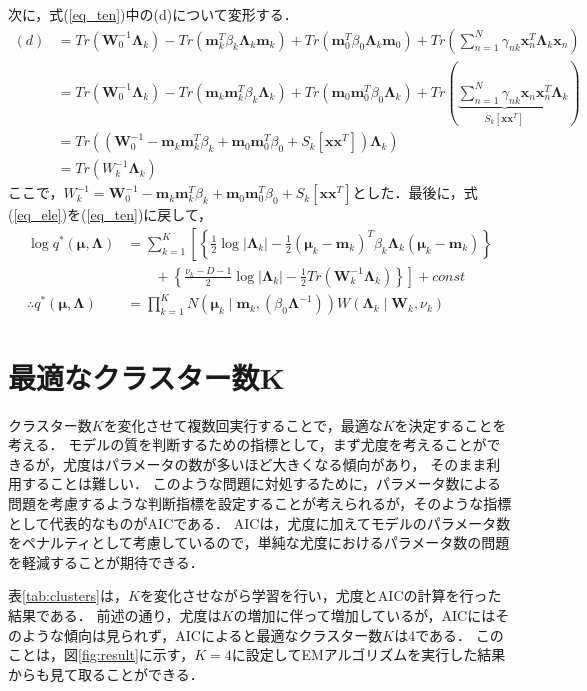 \documentclass[uplatex]{jsarticle}
\begin{document}
次に，式(\ref{eq_ten})中の(d)について変形する．
\begin{align}
\label{eq_ele}
(d) &= Tr(\bm{W}_0^{-1}\bm{\Lambda}_k) - Tr(\bm{m}_k^T\beta_k\bm{\Lambda}_k\bm{m}_k) + Tr(\bm{m}_0^T\beta_0\bm{\Lambda}_k\bm{m}_0) + Tr(\sum_{n=1}^N \gamma_{nk}\bm{x}_n^T\bm{\Lambda}_k\bm{x}_n) \nonumber \\
    &= Tr(\bm{W}_0^{-1}\bm{\Lambda}_k) - Tr(\bm{m}_k\bm{m}_k^T\beta_k\bm{\Lambda}_k) + Tr(\bm{m}_0\bm{m}_0^T\beta_0\bm{\Lambda}_k) + Tr(\underbrace{\sum_{n=1}^N \gamma_{nk}\bm{x}_n\bm{x}_n^T}_{S_k[\bm{x}\bm{x}^T]}\bm{\Lambda}_k) \nonumber \\
    &= Tr((\bm{W}_0^{-1} - \bm{m}_k\bm{m}_k^T\beta_k + \bm{m}_0\bm{m}_0^T\beta_0 + S_k[\bm{x}\bm{x}^T])\bm{\Lambda}_k) \nonumber \\
    &= Tr(W_k^{-1}\bm{\Lambda}_k)
\end{align}
ここで，$W_k^{-1} = \bm{W}_0^{-1} - \bm{m}_k\bm{m}_k^T\beta_k + \bm{m}_0\bm{m}_0^T\beta_0 + S_k[\bm{x}\bm{x}^T]$とした．最後に，式(\ref{eq_ele})を(\ref{eq_ten})に戻して，
\begin{align}
\log q^* (\bm{\mu}, \bm{\Lambda}) &= \sum_{k=1}^K \left[ \left\{ \frac{1}{2}\log|\bm{\Lambda}_k| - \frac{1}{2}(\bm{\mu}_k-\bm{m}_k)^T\beta_k\bm{\Lambda}_k(\bm{\mu}_k-\bm{m}_k) \right\} \right. \nonumber \\
 &\qquad+ \left. \left\{ \frac{\nu_k - D - 1}{2}\log|\bm{\Lambda}_k| - \frac{1}{2} Tr(\bm{W}_k^{-1}\bm{\Lambda}_k) \right\} \right] + const \nonumber \\
 \therefore q^*(\bm{\mu}, \bm{\Lambda}) &= \prod_{k=1}^K N(\bm{\mu}_k \mid \bm{m}_k, (\beta_0\bm{\Lambda}^{-1}))W(\bm{\Lambda}_k \mid \bm{W}_k, \nu_k)
\end{align}

\newpage
\section{最適なクラスター数K}
クラスター数$K$を変化させて複数回実行することで，最適な$K$を決定することを考える．
モデルの質を判断するための指標として，まず尤度を考えることができるが，尤度はパラメータの数が多いほど大きくなる傾向があり，
そのまま利用することは難しい．
このような問題に対処するために，パラメータ数による問題を考慮するような判断指標を設定することが考えられるが，そのような指標として代表的なものがAICである．
AICは，尤度に加えてモデルのパラメータ数をペナルティとして考慮しているので，単純な尤度におけるパラメータ数の問題を軽減することが期待できる．

表\ref{tab:clusters}は，$K$を変化させながら学習を行い，尤度とAICの計算を行った結果である．
前述の通り，尤度は$K$の増加に伴って増加しているが，AICにはそのような傾向は見られず，AICによると最適なクラスター数$K$は4である．
このことは，図\ref{fig:result}に示す，$K=4$に設定してEMアルゴリズムを実行した結果からも見て取ることができる．
\end{document}
